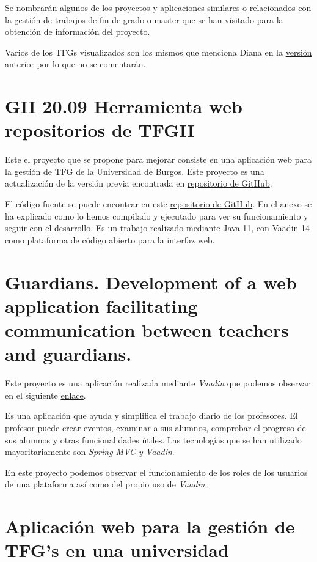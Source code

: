 Se nombrarán algunos de los proyectos y aplicaciones similares o relacionados con la gestión de trabajos de fin de grado o master que se han visitado para la obtención de información del proyecto.

Varios de los TFGs visualizados son los mismos que menciona Diana en la \href{https://github.com/dbo1001/Gestor-TFG-2021}{versión anterior} por lo que no se comentarán.  

\section{GII 20.09 Herramienta web repositorios de TFGII}
Este el proyecto que se propone para mejorar consiste en una aplicación web para la gestión de TFG de la Universidad de Burgos. Este proyecto es una actualización de la versión previa encontrada en \href{https://github.com/jfb0019/Gestor-TFG-2016}{repositorio de GitHub}. 

El código fuente se puede encontrar en este \href{https://github.com/dbo1001/Gestor-TFG-2021}{repositorio de GitHub}. En el anexo se ha explicado como lo hemos compilado y ejecutado para ver su funcionamiento y seguir con el desarrollo. Es un trabajo realizado mediante Java 11, con Vaadin 14 como plataforma de código abierto para la interfaz web. 

\section{Guardians. Development of a web application facilitating communication between teachers and guardians.}

Este proyecto es una aplicación realizada mediante \emph{Vaadin} que podemos observar en el siguiente \href{https://github.com/david-romero/tfg-vaadin}{enlace}.

Es una aplicación que ayuda y simplifica el trabajo diario de los profesores. El profesor puede crear eventos, examinar a sus alumnos, comprobar el progreso de sus alumnos y otras funcionalidades útiles. Las tecnologías que se han utilizado mayoritariamente son \emph{Spring MVC y Vaadin}.

En este proyecto podemos observar el funcionamiento de los roles de los usuarios de una plataforma así como del propio uso de \emph{Vaadin}.

\section{Aplicación web para la gestión de TFG's en una universidad}

